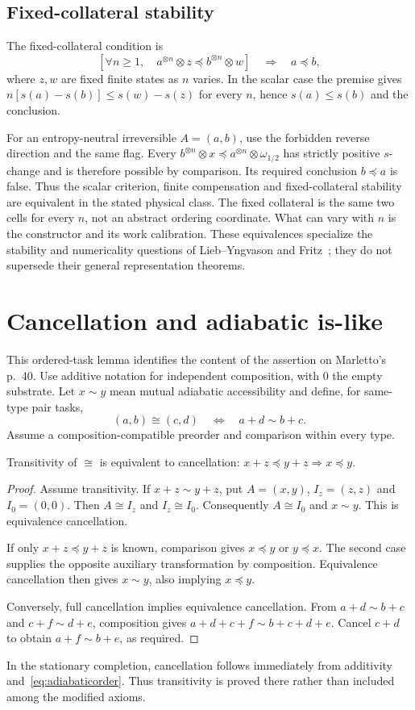 \subsection{Fixed-collateral stability}
The fixed-collateral condition is
\begin{equation}
 \left[\forall n\ge1,\quad a^{\otimes n}\otimes z\preceq b^{\otimes n}\otimes w\right]
 \quad\Longrightarrow\quad a\preceq b, \label{eq:collateral}
\end{equation}
where $z,w$ are fixed finite states as $n$ varies. In the scalar case the premise gives $n[s(a)-s(b)]\le s(w)-s(z)$ for every $n$, hence $s(a)\le s(b)$ and the conclusion.

For an entropy-neutral irreversible $A=(a,b)$, use the forbidden reverse direction and the same flag. Every $b^{\otimes n}\otimes x\preceq a^{\otimes n}\otimes\omega_{1/2}$ has strictly positive $s$-change and is therefore possible by comparison. Its required conclusion $b\preceq a$ is false. Thus the scalar criterion, finite compensation and fixed-collateral stability are equivalent in the stated physical class. The fixed collateral is the same two cells for every $n$, not an abstract ordering coordinate. What can vary with $n$ is the constructor and its work calibration. These equivalences specialize the stability and numericality questions of Lieb--Yngvason and Fritz~\cite{lieb,fritz}; they do not supersede their general representation theorems.

\section{Cancellation and adiabatic is-like}\label{app:cancellation}
This ordered-task lemma identifies the content of the assertion on Marletto's p.~40. Use additive notation for independent composition, with $0$ the empty substrate. Let $x\sim y$ mean mutual adiabatic accessibility and define, for same-type pair tasks,
\[
 (a,b)\cong(c,d)\quad\Longleftrightarrow\quad a+d\sim b+c.
\]
Assume a composition-compatible preorder and comparison within every type.
\begin{lemma}
Transitivity of $\cong$ is equivalent to cancellation: $x+z\preceq y+z\Longrightarrow x\preceq y$.
\end{lemma}
\begin{proof}
Assume transitivity. If $x+z\sim y+z$, put $A=(x,y)$, $I_z=(z,z)$ and $I_0=(0,0)$. Then $A\cong I_z$ and $I_z\cong I_0$. Consequently $A\cong I_0$ and $x\sim y$. This is equivalence cancellation.

If only $x+z\preceq y+z$ is known, comparison gives $x\preceq y$ or $y\preceq x$. The second case supplies the opposite auxiliary transformation by composition. Equivalence cancellation then gives $x\sim y$, also implying $x\preceq y$.

Conversely, full cancellation implies equivalence cancellation. From $a+d\sim b+c$ and $c+f\sim d+e$, composition gives $a+d+c+f\sim b+c+d+e$. Cancel $c+d$ to obtain $a+f\sim b+e$, as required.
\end{proof}
In the stationary completion, cancellation follows immediately from additivity and~\eqref{eq:adiabaticorder}. Thus transitivity is proved there rather than included among the modified axioms.
